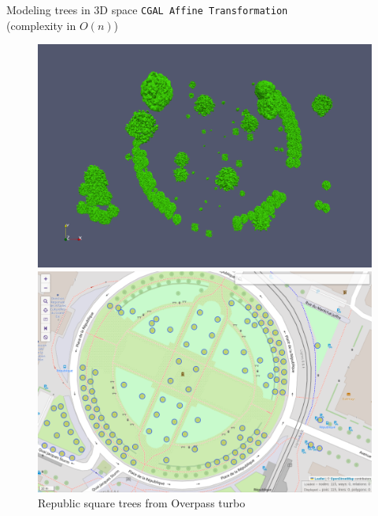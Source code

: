 \documentclass[10pt]{beamer}
\begin{document}
\begin{frame}{Modeling trees in 3D space}
  \Large
\texttt{CGAL Affine Transformation} \\
(complexity in $O(n)$)

\begin{figure}[H]
  \centering
  \begin{minipage}{0.49\textwidth}
      \centering
      \includegraphics[width=1\textwidth]{images/republic_lod3.png}
      \caption{Republic square with LOD 3 trees.}
  \end{minipage}\hfill
  \begin{minipage}{0.49\textwidth}
      \centering
      \includegraphics[width=1\textwidth]{images/republic_overpassturbo.png}
      \caption{Republic square trees from Overpass turbo}
  \end{minipage}
\end{figure}
\end{frame}
\end{document}

